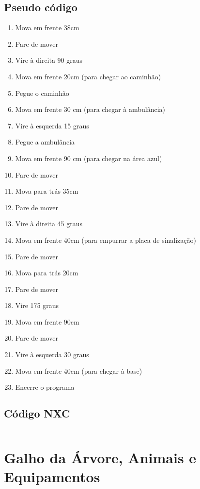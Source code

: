 \documentclass{article}
\begin{document}
	\subsection{Pseudo código}
		\begin{enumerate}
			\item Mova em frente 38cm
			\item Pare de mover
		    \item Vire à direita 90 graus
		    \item Mova em frente 20cm (para chegar ao caminhão)
		    \item Pegue o caminhão
		    \item Mova em frente 30 cm (para chegar à ambulância)
			\item Vire à esquerda 15 graus
			\item Pegue a ambulância
			\item Mova em frente 90 cm (para chegar na área azul)
		    \item Pare de mover
			\item Mova para trás 35cm
		    \item Pare de mover
		    \item Vire à direita 45 graus
		    \item Mova em frente 40cm (para empurrar a placa de sinalização)
		    \item Pare de mover
		    \item Mova para trás 20cm
		    \item Pare de mover
		    \item Vire 175 graus
			\item Mova em frente 90cm
			\item Pare de mover
			\item Vire à esquerda 30 graus
			\item Mova em frente 40cm (para chegar à base)
		    \item Encerre o programa
		\end{enumerate}

	\subsection{Código NXC}
		\inputminted[linenos, frame = single]{c}{../Ambulancia.nxc}

\newpage
\section{Galho da Árvore, Animais e Equipamentos}
\end{document}
